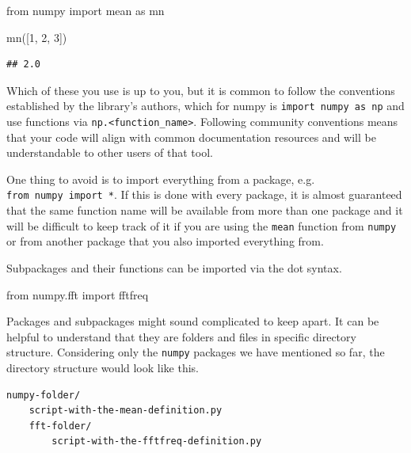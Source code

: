 \documentclass[]{Nemilov}
\newenvironment{Shaded}{\begin{snugshade}}{\end{snugshade}}
\newcommand{\DecValTok}[1]{\textcolor[rgb]{0.00,0.00,0.81}{#1}}
\newcommand{\ImportTok}[1]{#1}
\newcommand{\NormalTok}[1]{#1}
\begin{document}
\begin{Shaded}
\begin{Highlighting}[]
\ImportTok{from}\NormalTok{ numpy }\ImportTok{import}\NormalTok{ mean }\ImportTok{as}\NormalTok{ mn}

\NormalTok{mn([}\DecValTok{1}\NormalTok{, }\DecValTok{2}\NormalTok{, }\DecValTok{3}\NormalTok{])}
\end{Highlighting}
\end{Shaded}

\begin{verbatim}
## 2.0
\end{verbatim}

Which of these you use is up to you, but it is common to follow the conventions
established by the library's authors, which for numpy is \texttt{import\ numpy\ as\ np}
and use functions via \texttt{np.\textless{}function\_name\textgreater{}}. Following community conventions means
that your code will align with common documentation resources and will be understandable to other users of that tool.

One thing to avoid is to import everything from a package, e.g. \texttt{from\ numpy\ import\ *}.
If this is done with every package, it is almost guaranteed that the same function name
will be available from more than one package and it will be difficult to keep track of it
if you are using the \texttt{mean} function from \texttt{numpy} or from another package that you also
imported everything from.

Subpackages and their functions can be imported via the dot syntax.

\begin{Shaded}
\begin{Highlighting}[]
\ImportTok{from}\NormalTok{ numpy.fft }\ImportTok{import}\NormalTok{ fftfreq}
\end{Highlighting}
\end{Shaded}

Packages and subpackages might sound complicated to keep apart. It can be
helpful to understand that they are folders and files in specific directory
structure. Considering only the \texttt{numpy} packages we have mentioned so far, the
directory structure would look like this.

\begin{verbatim}
numpy-folder/
    script-with-the-mean-definition.py
    fft-folder/
        script-with-the-fftfreq-definition.py
\end{verbatim}
\end{document}
